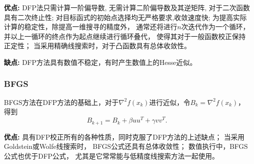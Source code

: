                 \textbf{优点:}
                    DFP法只需计算一阶偏导数,
                    无需计算二阶偏导数及其逆矩阵,
                    对于二次函数具有二次终止性;
                    对目标函式的初始点选择均无严格要求,收敛速度快;
                    为提高实际计算的稳定性，除提高一维搜寻的精度外，
                    通常还将进行$n$次迭代作为一个循环，
                    并以上一循环的终点作为起点继续进行循环叠代，
                    使得其对于一般函数校正保持正定性；
                    当采用精确线搜索时，对于凸函数具有总体收敛性。
                
                \textbf{缺点:}
                    DFP方法具有数值不稳定，有时产生数值上的Hesse近似。
                    
            \subsubsection{BFGS}
                BFGS方法\cite{1989On}在DFP方法的基础上，对于$\nabla^2f(x_k)$进行近似，令$B_k=\nabla^2f(x_k)$，得到
                \begin{equation}
                    B_{k+1} = B_k + \beta uu^T + \gamma vv^T.
                \end{equation}
                
                \textbf{优点:}
                    具有DFP校正所有的各种性质，同时克服了DFP方法的上述缺点；
                    当采用Goldstein或Wolfe线搜索时，
                    BFGS公式还具有总体收敛性；
                    数值执行中，BFGS公式也优于DFP公式，
                    尤其是它常常能与低精度线搜索方法一起使用。
                        
            
            
